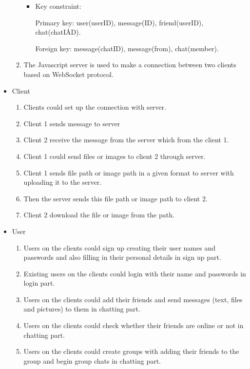 \documentclass[a4paper,11pt]{article}
\begin{document}
\begin{itemize}
\begin{enumerate}
\begin{itemize}
\item Key constraint:

Primary key: user(userID), message(ID), friend(userID), chat(chatIÅD).

Foreign key: message(chatID), message(from), chat(member).

\end{itemize}

\item The Javascript server is used to make a connection between two clients based on WebSocket protocol.
\end{enumerate}








\item Client
\begin{enumerate}
\item Clients could set up the connection with server.
\item Client 1 sends message to server
\item Client 2 receive the message from the server which from the client 1.
\item Client 1 could send files or images to client 2 through server. 
\item Client 1 sends file path or image path in a given format to server with uploading it to the server. 
\item Then the server sends this file path or image path to client 2.
\item Client 2 download the file or image from the path.
\end {enumerate}
\item User

\begin{enumerate}

\item Users on the clients could sign up creating their user names and passwords and also filling in their personal details in sign up part.
\item Existing users on the clients could login with their name and passwords in login part. 
\item Users on the clients could add their friends and send messages (text, files and pictures) to them in chatting part.
\item Users on the clients could check whether their friends are online or not in chatting part.
\item  Users on the clients could create groups with adding their friends to the group and begin group chats in chatting part.


\end{enumerate}
\end{itemize}
\end{document}
